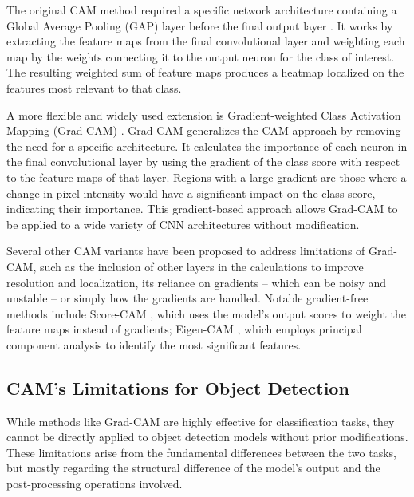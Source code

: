 The original CAM method required a specific network architecture containing a Global Average Pooling (GAP) layer before the final output layer \cite{zhou2016learning}. It works by extracting the feature maps from the final convolutional layer and weighting each map by the weights connecting it to the output neuron for the class of interest. The resulting weighted sum of feature maps produces a heatmap localized on the features most relevant to that class.

A more flexible and widely used extension is Gradient-weighted Class Activation Mapping (Grad-CAM) \cite{selvaraju2019gradcam}. Grad-CAM generalizes the CAM approach by removing the need for a specific architecture. It calculates the importance of each neuron in the final convolutional layer by using the gradient of the class score with respect to the feature maps of that layer.
Regions with a large gradient are those where a change in pixel intensity would have a significant impact on the class score, indicating their importance. This gradient-based approach allows Grad-CAM to be applied to a wide variety of CNN architectures without modification.

Several other CAM variants have been proposed to address limitations of Grad-CAM, such as the inclusion of other layers in the calculations to improve resolution and localization, its reliance on gradients -- which can be noisy and unstable -- or simply how the gradients are handled. 
Notable gradient-free methods include Score-CAM \cite{wang2020score}, which uses the model's output scores to weight the feature maps instead of gradients; Eigen-CAM \cite{muhammad2020eigen}, which employs principal component analysis to identify the most significant features.


\subsection{CAM's Limitations for Object Detection}
While methods like Grad-CAM are highly effective for classification tasks, they cannot be directly applied to object detection models without prior modifications. These limitations arise from the fundamental differences between the two tasks, but mostly regarding the structural difference of the model's output and the post-processing operations involved.

